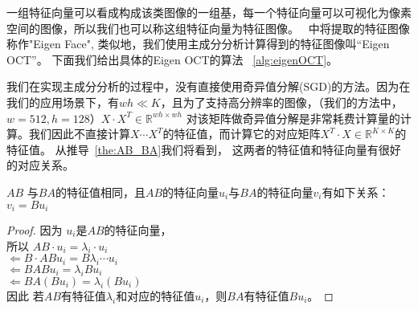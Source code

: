         一组特征向量可以看成构成该类图像的一组基，每一个特征向量可以可视化为像素空间的图像，所以我们也可以称这组特征向量为特征图像。~\cite{turk1991eigenfaces} 中将提取的特征图像称作"Eigen Face", 类似地，我们使用主成分分析计算得到的特征图像叫“Eigen OCT”。 下面我们给出具体的Eigen OCT的算法 ~\ref{alg:eigenOCT}。

        我们在实现主成分分析的过程中，没有直接使用奇异值分解(SGD)的方法。因为在我们的应用场景下，有$wh \ll K$，且为了支持高分辨率的图像，（我们的方法中，$w = 512, h = 128$）$X\cdot X^T \in \mathbb{R}^{wh \times wh}$ 对该矩阵做奇异值分解是非常耗费计算量的计算。我们因此不直接计算$X\cdots  X^T$的特征值，而计算它的对应矩阵$X^T \cdot X \in \mathbb{R} ^{K \times K}$的特征值。 从推导~\ref{the:AB_BA}我们将看到， 这两者的特征值和特征向量有很好的对应关系。

        \begin{theorem}\label{the:AB_BA}
            $AB$ 与$BA$的特征值相同，且$AB$的特征向量$u_i$与$BA$的特征向量$v_i$有如下关系：$v_i = Bu_i$
        \end{theorem}
        \begin{proof}
        
            因为 $u_i$是$AB$的特征向量，\\
            所以  $AB \cdot u_i = \lambda_i \cdot u_i$\\
            $\Leftarrow B\cdot AB u_i = B \lambda_i \cdots u_i$\\
            $\Leftarrow BAB u_i = \lambda_i B u_i$\\
            $\Leftarrow BA(Bu_i)= \lambda_i (Bu_i)$\\
            因此 若$AB$有特征值$\lambda_i$和对应的特征值$u_i$，则$BA$有特征值$Bu_i$。
        
        \end{proof}


